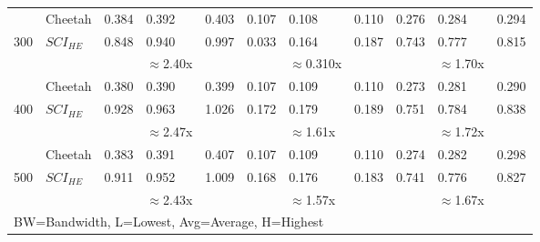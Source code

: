 \begin{tabular}{lllllllllll}
               & Cheetah & 0.384  & 0.392    & 0.403 & 0.107         & 0.108           & 0.110         & 0.276         & 0.284           & 0.294         \\
300            & $SCI_{HE}$ & 0.848  & 0.940    & 0.997 & 0.033         & 0.164           & 0.187         & 0.743         & 0.777           & 0.815         \\ \cline{3-11} 
               &         &        & $\approx$2.40x    &       &               & $\approx$0.310x           &               &               & $\approx$1.70x           &               \\ \hline
               & Cheetah & 0.380  & 0.390    & 0.399 & 0.107         & 0.109           & 0.110         & 0.273         & 0.281           & 0.290         \\
400            & $SCI_{HE}$ & 0.928  & 0.963    & 1.026 & 0.172         & 0.179           & 0.189         & 0.751         & 0.784           & 0.838         \\ \cline{3-11} 
               &         &        & $\approx$2.47x    &       &               & $\approx$1.61x           &               &               & $\approx$1.72x           &               \\ \hline
               & Cheetah & 0.383  & 0.391    & 0.407 & 0.107         & 0.109           & 0.110         & 0.274         & 0.282           & 0.298         \\
500            & $SCI_{HE}$ & 0.911  & 0.952    & 1.009 & 0.168         & 0.176           & 0.183         & 0.741         & 0.776           & 0.827         \\ \cline{3-11} 
               &         &        & $\approx$2.43x    &       &               & $\approx$1.57x           &               &               & $\approx$1.67x           &               \\ \hline
\multicolumn{11}{l}{BW=Bandwidth, L=Lowest, Avg=Average, H=Highest}                                                                                      
\end{tabular}